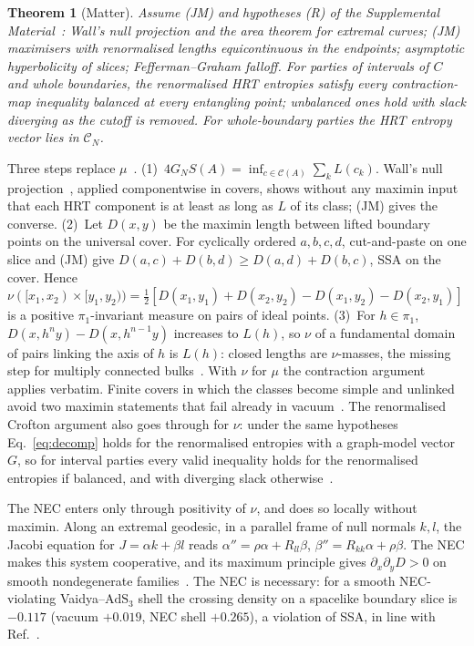 \documentclass[aps,prl,twocolumn,superscriptaddress,nofootinbib,amsmath,amssymb]{revtex4-2}
\newtheorem{theorem}{Theorem}
\theoremstyle{definition}
\newcommand{\AdS}{\mathrm{AdS}_3}
\newcommand{\Cut}{\mathcal{C}}
\newcommand{\CN}{\mathcal{C}_N}
\newcommand{\SM}{Supplemental Material~\cite{SM}}
\begin{document}
\begin{theorem}[Matter]\label{thm:matter}
Assume (JM) and hypotheses (R) of the \SM: Wall's null projection and the area theorem for extremal curves;
(JM) maximisers with renormalised lengths equicontinuous in the endpoints; asymptotic hyperbolicity of slices;
Fefferman--Graham falloff. For parties of intervals of $C$ and whole boundaries,
the renormalised HRT entropies satisfy every contraction-map inequality balanced at every entangling point;
unbalanced ones hold with slack diverging as the cutoff is removed. For whole-boundary parties the HRT entropy
vector lies in $\CN$.
\end{theorem}

Three steps replace $\mu$~\cite{SM}. (1)~$4G_NS(A)=\inf_{c\in\Cut(A)}\sum_kL(c_k)$. Wall's null
projection~\cite{Wall2014,CDGH2001}, applied componentwise in covers, shows without any maximin input that each HRT
component is at least as long as $L$ of its class; (JM) gives the converse. (2)~Let $D(x,y)$ be the maximin length between
lifted boundary points on the universal cover. For cyclically ordered $a,b,c,d$, cut-and-paste on one slice and
(JM) give $D(a,c)+D(b,d)\ge D(a,d)+D(b,c)$, SSA on the cover. Hence
$\nu([x_1,x_2)\times[y_1,y_2))=\frac12[D(x_1,y_1)+D(x_2,y_2)-D(x_1,y_2)-D(x_2,y_1)]$ is a positive $\pi_1$-invariant
measure on pairs of ideal points. (3)~For $h\in\pi_1$, $D(x,h^ny)-D(x,h^{n-1}y)$ increases to $L(h)$, so $\nu$ of a
fundamental domain of pairs linking the axis of $h$ is $L(h)$: closed lengths are $\nu$-masses, the missing step for
multiply connected bulks~\cite{CzechDong2019,GGHH2025}. With $\nu$ for $\mu$ the contraction argument applies
verbatim. Finite covers in which the classes become simple and unlinked avoid two maximin statements that fail
already in vacuum~\cite{Hall1949,SM}.
The renormalised Crofton argument also goes through for $\nu$: under the same hypotheses Eq.~\eqref{eq:decomp}
holds for the renormalised entropies with a graph-model vector $G$, so for interval parties every valid
inequality holds for the renormalised entropies if balanced, and with diverging slack otherwise~\cite{SM}.

The NEC enters only through positivity of $\nu$, and does so locally without maximin. Along an extremal
geodesic, in a parallel frame of null normals $k,l$, the Jacobi equation for $J=\alpha k+\beta l$ reads
$\alpha''=\rho\alpha+R_{ll}\beta$, $\beta''=R_{kk}\alpha+\rho\beta$. The NEC makes this system cooperative, and its
maximum principle gives $\partial_x\partial_yD>0$ on smooth nondegenerate families~\cite{SM}. The NEC is necessary: for a
smooth NEC-violating Vaidya--$\AdS$ shell the crossing density on a spacelike boundary slice is $-0.117$ (vacuum
$+0.019$, NEC shell $+0.265$), a violation of SSA, in line with Ref.~\cite{CallanHeHeadrick2012}.
\end{document}
